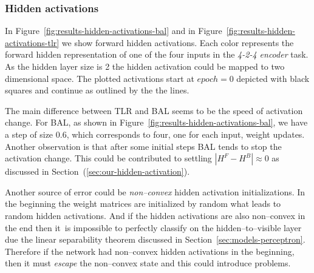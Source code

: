 \subsubsection{Hidden activations} 
\label{sec:tlr-auto4-hidden}

In Figure~\ref{fig:results-hidden-activations-bal} and in Figure~\ref{fig:results-hidden-activations-tlr} we show forward hidden activations. Each color represents the forward hidden representation of one of the four inputs in the \emph{4-2-4 encoder} task. As the hidden layer size is 2 the hidden activation could be mapped to two dimensional space. The plotted activations start at $epoch=0$ depicted with black squares and continue as outlined by the the lines. 

The main difference between TLR and BAL seems to be the speed of activation change. For BAL, as shown in Figure~\ref{fig:results-hidden-activations-bal}, we have a step of size 0.6, which corresponds to four, one for each input, weight updates. Another observation is that after some initial steps BAL tends to stop the activation change. This could be contributed to settling $|H^F-H^B| \approx 0$ as discussed in Section~(\ref{sec:our-hidden-activation}). 

Another source of error could be \emph{non--convex} hidden activation initializations. In the beginning the weight matrices are initialized by random what leads to random hidden activations. And if the hidden activations are also non--convex in the end then it~is impossible to perfectly classify on the hidden--to--visible layer due the linear separability theorem discussed in Section~\ref{sec:models-perceptron}. Therefore if the network had non--convex hidden activations in the beginning, then it must \emph{escape} the non--convex state and this could introduce problems. 


